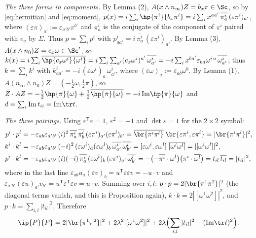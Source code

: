 \emph{The three forms in components.} By Lemma (2), $A(x\wedge n_{\infty})Z = b_{x}\pi \in \Sc$, so by \eqref{eq:hermitian} and \eqref{eq:moment}, $p(x) = i\sum_{i}\hp{\pi^{i}}{b_{x}\pi^{i}} = i\sum_{i} x^{aa'}\,\overline{\pi^{i}_{a}}\,(\varepsilon\pi^{i})_{a'}$, where $(\varepsilon\pi)_{a'} := \varepsilon_{a'b'}\pi^{b'}$ and $\overline{\pi^{i}_{a}}$ is the conjugate of the component of $\pi^{i}$ paired with $e_{a}$ by $\Sigma$. Thus $p = \sum_{i}p^{i}$ with $p^{i}_{aa'} = i\,\overline{\pi^{i}_{a}}\,(\varepsilon\pi^{i})_{a'}$. By Lemma (3), $A(x\wedge n_{0})Z = c_{x}\omega \in \Sc'$, so $k(x) = i\sum_{i}\overline{\hp{c_{x}\omega^{i}}{\omega^{i}}} = i\sum_{i}\sum_{a'}(c_{x}\omega^{i})^{a'}\,\overline{\omega^{i}_{a'}} = -i\sum_{i}x^{ba'}\varepsilon_{ba}\omega^{i\,a}\,\overline{\omega^{i}_{a'}}$; thus $k = \sum_{i}k^{i}$ with $k^{i}_{aa'} = -i\,(\varepsilon\omega^{i})_{a}\,\overline{\omega^{i}_{a'}}$, where $(\varepsilon\omega)_{a} := \varepsilon_{ab}\omega^{b}$. By Lemma (1), $A(n_{\infty}\wedge n_{0})Z = (-\tfrac12\omega, \tfrac12\pi)$, so $\bar{Z}\cdot AZ = -\tfrac12\hp{\pi}{\omega} + \tfrac12\overline{\hp{\pi}{\omega}} = -i\,\mathrm{Im}\hp{\pi}{\omega}$ and $d = \sum_{i}\mathrm{Im}\,t_{ii} = \mathrm{Im}\tr t$.

\emph{The three pairings.} Using $\varepsilon^{\mathsf T}\varepsilon = 1$, $\varepsilon^{2} = -1$ and $\det\varepsilon = 1$ for the $2\times 2$ symbol:
\begin{align*}
p^{i}\cdot p^{l} &= -\varepsilon_{ab}\varepsilon_{a'b'}\,(i)^{2}\,\overline{\pi^{i}_{a}}\,\overline{\pi^{l}_{b}}\,(\varepsilon\pi^{i})_{a'}(\varepsilon\pi^{l})_{b'}
= \overline{\br{\pi^{i}\pi^{l}}}\;\br{\varepsilon\pi^{i},\varepsilon\pi^{l}} = |\br{\pi^{i}\pi^{l}}|^{2},\\
k^{i}\cdot k^{l} &= -\varepsilon_{ab}\varepsilon_{a'b'}\,(-i)^{2}\,(\varepsilon\omega^{i})_{a}(\varepsilon\omega^{l})_{b}\,\overline{\omega^{i}_{a'}}\,\overline{\omega^{l}_{b'}}
= [\varepsilon\omega^{i},\varepsilon\omega^{l}]\;\overline{[\omega^{i}\omega^{l}]} = |[\omega^{i}\omega^{l}]|^{2},\\
p^{i}\cdot k^{l} &= -\varepsilon_{ab}\varepsilon_{a'b'}\,(i)(-i)\,\overline{\pi^{i}_{a}}\,(\varepsilon\omega^{l})_{b}\,(\varepsilon\pi^{i})_{a'}\,\overline{\omega^{l}_{b'}}
= -\bigl(-\overline{\pi^{i}}\cdot\omega^{l}\bigr)\bigl(\pi^{i}\cdot\overline{\omega^{l}}\bigr) = t_{il}\,\overline{t_{il}} = |t_{il}|^{2},
\end{align*}
where in the last line $\varepsilon_{ab}u_{a}(\varepsilon v)_{b} = u^{\mathsf T}\varepsilon\varepsilon v = -u\cdot v$ and $\varepsilon_{a'b'}(\varepsilon u)_{a'}v_{b'} = u^{\mathsf T}\varepsilon^{\mathsf T}\varepsilon v = u\cdot v$. Summing over $i, l$: $p\cdot p = 2|\br{\pi^{1}\pi^{2}}|^{2}$ (the diagonal terms vanish, and this is Proposition  again), $k\cdot k = 2|[\omega^{1}\omega^{2}]|^{2}$, and $p\cdot k = \sum_{i,l}|t_{il}|^{2}$. Therefore
\[
\ip{P}{P} = 2|\br{\pi^{1}\pi^{2}}|^{2} + 2\lambda^{2}|[\omega^{1}\omega^{2}]|^{2} + 2\lambda\Bigl(\sum_{i,l}|t_{il}|^{2} - (\mathrm{Im}\tr t)^{2}\Bigr).
\]

